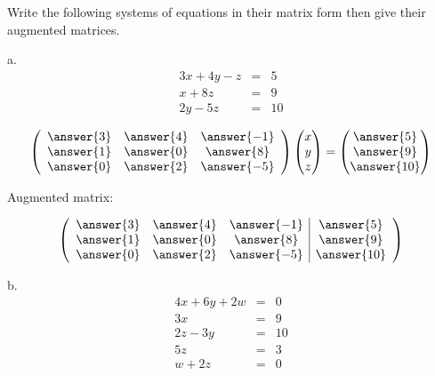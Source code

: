 \documentclass{ximera}
\author{Parisa Fatheddin}
\begin{document}
\begin{exercise}

Write the following systems of equations in their matrix form then give their augmented matrices.

a.
\begin{eqnarray*}
3x+ 4y -z &=& 5\\
x + 8z&=&9 \\
2y -5z &=& 10
\end{eqnarray*}

\begin{prompt}
\begin{equation*}
\left(\begin{array}{ccc}
\answer{3} & \answer{4} & \answer{-1} \\
\answer{1} & \answer{0} & \answer{8}\\
\answer{0} & \answer{2} & \answer{-5}
\end{array}\right) \begin{pmatrix}
x \\
y\\
z
\end{pmatrix} = \begin{pmatrix} \answer{5}\\
\answer{9}\\
\answer{10}
\end{pmatrix}
\end{equation*}

Augmented matrix:

\[\left(\begin{array}{ccc|c}
\answer{3} & \answer{4} & \answer{-1} & \answer{5}\\
\answer{1} & \answer{0} & \answer{8} & \answer{9}\\
\answer{0} & \answer{2} & \answer{-5} & \answer{10}
\end{array}\right)\]
\end{prompt}

b.
\begin{eqnarray*}
4x + 6y +2w &=& 0\\
3x &=& 9\\
2z -3y &=& 10\\
5z &=& 3\\
w + 2z &=& 0
\end{eqnarray*}


\end{exercise}
\end{document}
